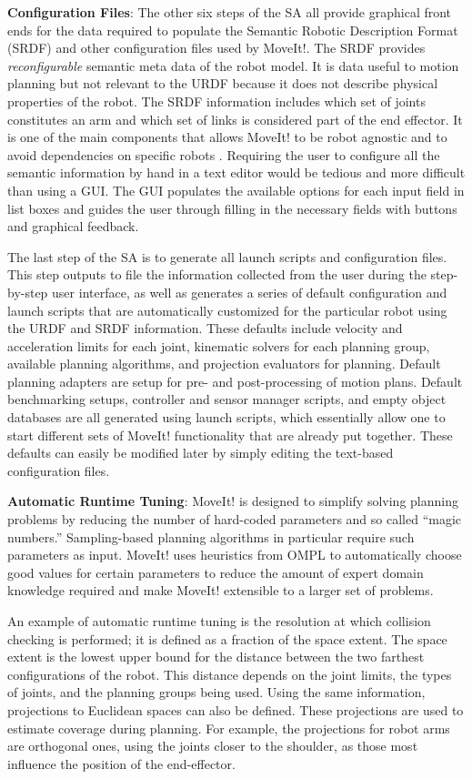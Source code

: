 \documentclass[10pt,journal,compsoc]{joser1}
\begin{document}
{{\bf Configuration Files}: The other six steps of the SA all provide graphical
front ends for the data required to populate the Semantic Robotic Description
Format (SRDF) and other configuration files used by MoveIt!. The SRDF provides
\textit{reconfigurable} semantic meta data of the robot model. It is data useful
to motion planning but not relevant to the URDF because it does not describe
physical properties of the robot. The SRDF information includes which set of
joints constitutes an arm and which set of links is considered part of the end
effector. It is one of the main components that allows MoveIt! to be robot
agnostic and to avoid dependencies on specific robots \cite{moveit}. Requiring
the user to configure all the semantic information by hand in a text editor
would be tedious and more difficult than using a GUI. The GUI populates the
available options for each input field in list boxes and guides the user through
filling in the necessary fields with buttons and graphical feedback.

The last step of the SA is to generate all launch scripts and configuration
files. This step outputs to file the information collected from the user during
the step-by-step user interface, as well as generates a series of default
configuration and launch scripts that are automatically customized for the
particular robot using the URDF and SRDF information. These defaults include
velocity and acceleration limits for each joint, kinematic solvers for each
planning group, available planning algorithms, and projection evaluators for
planning. Default planning adapters are setup for pre- and post-processing of
motion plans. Default benchmarking setups, controller and sensor manager
scripts, and empty object databases are all generated using launch scripts,
which essentially allow one to start different sets of MoveIt! functionality
that are already put together. These defaults can easily be modified later by
simply editing the text-based configuration files.

{\bf Automatic Runtime Tuning}: MoveIt! is designed to simplify solving planning
problems by reducing the number of hard-coded parameters and so called ``magic
numbers.'' Sampling-based planning algorithms in particular require such
parameters as input. MoveIt! uses heuristics from OMPL to automatically choose
good values for certain parameters to reduce the amount of expert domain
knowledge required and make MoveIt! extensible to a larger set of problems. 

An example of automatic runtime tuning is the resolution at which collision
checking is performed; it is defined as a fraction of the space extent. The
space extent is the lowest upper bound for the distance between the two farthest
configurations of the robot. This distance depends on the joint limits, the
types of joints, and the planning groups being used. Using the same information,
projections to Euclidean spaces can also be defined. These projections are used
to estimate coverage during planning. For example, the projections for robot
arms are orthogonal ones, using the joints closer to the shoulder, as those most
influence the position of the end-effector.

}
\end{document}
